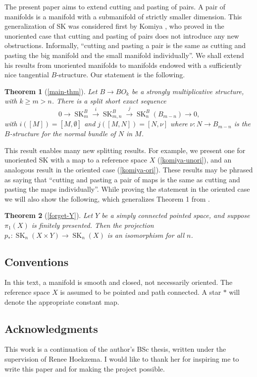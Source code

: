 \documentclass{amsart}
\newtheorem{thmx}{Theorem}
\theoremstyle{definition}
\theoremstyle{remark}
\newcommand{\SK}{\operatorname{SK}}
\begin{document}
The present paper aims to extend cutting and pasting of pairs. A pair of manifolds is a manifold with a submanifold of strictly smaller dimension. This generalization of SK was considered first by Komiya \cite{komiya1986}, who proved in the unoriented case that cutting and pasting of pairs does not introduce any new obstructions. Informally, ``cutting and pasting a pair is the same as cutting and pasting the big manifold and the small manifold individually''. We shall extend his results from unoriented manifolds to  manifolds endowed with a sufficiently nice tangential $B$-structure. Our statement is the following.
\begin{thmx}[\cref{main-thm}]
Let $B\to BO_k$ be a strongly multiplicative structure, with $k\geq m > n$. There is a split short exact sequence
    \[0\to \SK^B_m \xrightarrow{i} \SK^B_{m,n} \xrightarrow{j} \SK^{B}_n(B_{m-n}) \to 0,\]
    with $i([M]) = [M,\emptyset]$ and $j([M,N]) = [N,\nu]$ where $\nu: N \to B_{m-n}$ is the $B$-structure for the normal bundle of $N$ in $M$.
\end{thmx}
This result enables many new splitting results. For example, we present one for unoriented SK with a map to a reference space $X$ (\cref{komiya-unori}), and an analogous result in the oriented case (\cref{komiya-ori}). These results may be phrased as saying that ``cutting and pasting a pair of maps is the same as cutting and pasting the maps individually''. While proving the statement in the oriented case we will also show the following, which generalizes Theorem 1 from \cite{neumann1975}.
\begin{thmx}[\cref{forget-Y}]
    Let $Y$ be a simply connected pointed space, and suppose $\pi_1(X)$ is finitely presented. Then the projection $p_*:\SK_n(X\times Y)\to\SK_n(X)$ is an isomorphism for all $n$.
\end{thmx}

\subsection*{Conventions}
In this text, a manifold is smooth and closed, not necessarily oriented. The reference space $X$ is assumed to be pointed and path connected. A star $*$ will denote the appropriate constant map.

\subsection*{Acknowledgments}
This work is a continuation of the author's BSc thesis, written under the supervision of Renee Hoekzema. I would like to thank her for inspiring me to write this paper and for making the project possible.
\end{document}
